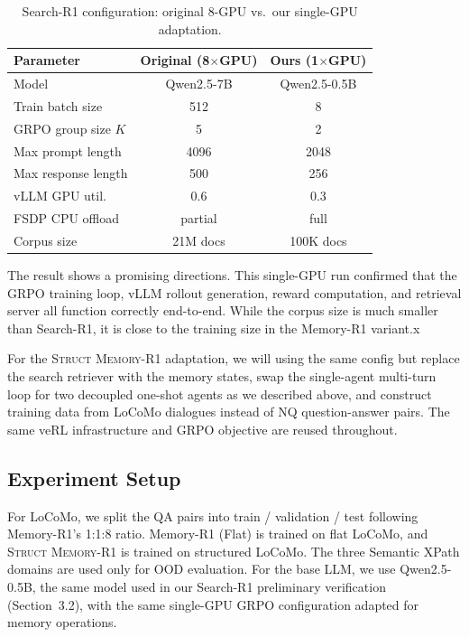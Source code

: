 \documentclass{article}
\theoremstyle{definition}
\begin{document}
\begin{table}[h]
\centering
\caption{Search-R1 configuration: original 8-GPU vs.\ our single-GPU adaptation.}
\label{tab:config}
\small
\begin{tabular}{lcc}
\toprule
\textbf{Parameter} & \textbf{Original (8$\times$GPU)} & \textbf{Ours (1$\times$GPU)} \\
\midrule
Model & Qwen2.5-7B & Qwen2.5-0.5B \\
Train batch size & 512 & 8 \\
GRPO group size $K$ & 5 & 2 \\
Max prompt length & 4096 & 2048 \\
Max response length & 500 & 256 \\
vLLM GPU util. & 0.6 & 0.3 \\
FSDP CPU offload & partial & full \\
Corpus size & 21M docs & 100K docs \\
\bottomrule
\end{tabular}
\end{table}
The result shows a promising directions. This single-GPU run confirmed that the GRPO training loop, vLLM rollout generation, reward computation, and retrieval server all function correctly end-to-end. While the corpus size is much smaller than Search-R1, it is close to the training size in the Memory-R1 variant.x 

For the \textsc{Struct Memory-R1} adaptation, we will using the same config but replace the search retriever with the memory states, swap the single-agent multi-turn loop for two decoupled one-shot agents as we described above, and construct training data from LoCoMo dialogues instead of NQ question-answer pairs. The same veRL infrastructure and GRPO objective are reused throughout.


\subsection{Experiment Setup}

For LoCoMo, we split the QA pairs into train / validation / test following Memory-R1's 1:1:8 ratio. Memory-R1 (Flat) is trained on flat LoCoMo, and \textsc{Struct Memory-R1} is trained on structured LoCoMo. The three Semantic XPath domains are used only for OOD evaluation. For the base LLM, we use Qwen2.5-0.5B, the same model used in our Search-R1 preliminary verification (Section~3.2), with the same single-GPU GRPO configuration adapted for memory operations.
\end{document}

